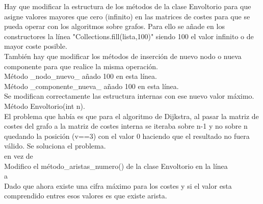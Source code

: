\begin{itemize}
Hay que modificar la estructura de los métodos de la clase Envoltorio para que asigne valores mayores que cero (infinito) en las matrices de costes para que se pueda operar con los algoritmos sobre grafos. Para ello se añade en los constructores la línea "Collections.fill(lista,100)" siendo 100 el valor infinito o de mayor coste posible.\\

También hay que modificar los métodos de inserción de nuevo nodo o nueva componente para que realice la misma operación.\\

Método \_nodo\_nuevo\_ añado 100 en esta línea.\\



Método \_componente\_nueva\_ añado 100 en esta línea.\\



Se modifican correctamente las estructura internas con ese nuevo valor máximo.\\

Método Envoltorio(int n).\\



El problema que había es que para el algoritmo de Dijkstra, al pasar la matriz de costes del grafo a la matriz de costes interna se iteraba sobre n-1 y no sobre n quedando la posición (v==3) con el valor 0 haciendo que el resultado no fuera válido. Se soluciona el problema. \\



en vez de\\



Modifico el método\_aristas\_numero() de la clase Envoltorio en la línea\\



a \\



Dado que ahora existe una cifra máximo para los costes y si el valor esta comprendido entres esos valores es que existe arista.\\


\end{itemize}
